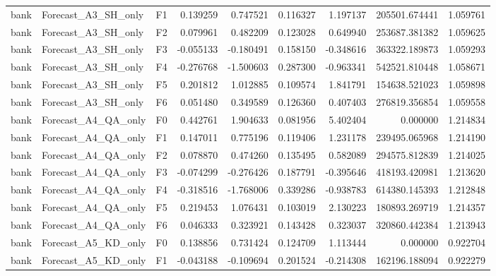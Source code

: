 \begin{tabular}{lllrrrrrr}
      bank &          Forecast\_A3\_SH\_only &  F1 &  0.139259 &  0.747521 & 0.116327 &  1.197137 &    205501.674441 &             1.059761 \\
      bank &          Forecast\_A3\_SH\_only &  F2 &  0.079961 &  0.482209 & 0.123028 &  0.649940 &    253687.381382 &             1.059625 \\
      bank &          Forecast\_A3\_SH\_only &  F3 & -0.055133 & -0.180491 & 0.158150 & -0.348616 &    363322.189873 &             1.059293 \\
      bank &          Forecast\_A3\_SH\_only &  F4 & -0.276768 & -1.500603 & 0.287300 & -0.963341 &    542521.810448 &             1.058671 \\
      bank &          Forecast\_A3\_SH\_only &  F5 &  0.201812 &  1.012885 & 0.109574 &  1.841791 &    154638.521023 &             1.059898 \\
      bank &          Forecast\_A3\_SH\_only &  F6 &  0.051480 &  0.349589 & 0.126360 &  0.407403 &    276819.356854 &             1.059558 \\
      bank &          Forecast\_A4\_QA\_only &  F0 &  0.442761 &  1.904633 & 0.081956 &  5.402404 &         0.000000 &             1.214834 \\
      bank &          Forecast\_A4\_QA\_only &  F1 &  0.147011 &  0.775196 & 0.119406 &  1.231178 &    239495.065968 &             1.214190 \\
      bank &          Forecast\_A4\_QA\_only &  F2 &  0.078870 &  0.474260 & 0.135495 &  0.582089 &    294575.812839 &             1.214025 \\
      bank &          Forecast\_A4\_QA\_only &  F3 & -0.074299 & -0.276426 & 0.187791 & -0.395646 &    418193.420981 &             1.213620 \\
      bank &          Forecast\_A4\_QA\_only &  F4 & -0.318516 & -1.768006 & 0.339286 & -0.938783 &    614380.145393 &             1.212848 \\
      bank &          Forecast\_A4\_QA\_only &  F5 &  0.219453 &  1.076431 & 0.103019 &  2.130223 &    180893.269719 &             1.214357 \\
      bank &          Forecast\_A4\_QA\_only &  F6 &  0.046333 &  0.323921 & 0.143428 &  0.323037 &    320860.442384 &             1.213943 \\
      bank &          Forecast\_A5\_KD\_only &  F0 &  0.138856 &  0.731424 & 0.124709 &  1.113444 &         0.000000 &             0.922704 \\
      bank &          Forecast\_A5\_KD\_only &  F1 & -0.043188 & -0.109694 & 0.201524 & -0.214308 &    162196.188094 &             0.922279 \\

\end{tabular}
